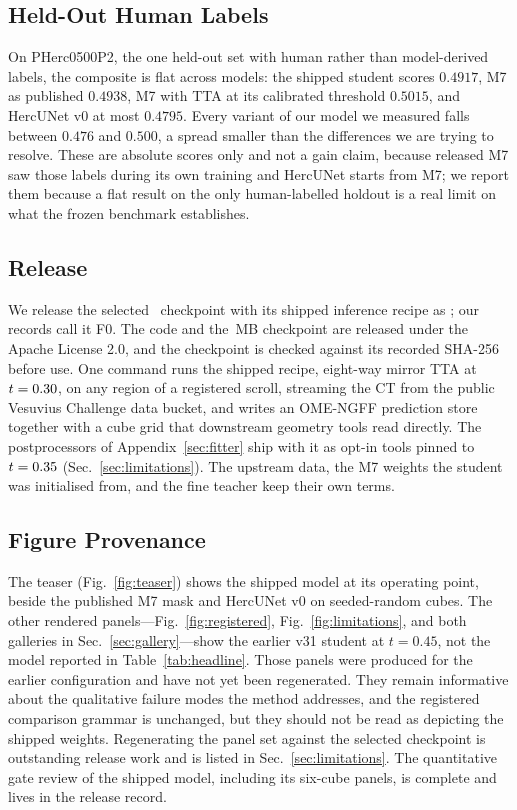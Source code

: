 \subsection{Held-Out Human Labels}

On PHerc0500P2, the one held-out set with human rather than model-derived
labels, the composite is flat across models: the shipped student scores
$0.4917$, M7 as published $0.4938$, M7 with TTA at its calibrated threshold
$0.5015$, and HercUNet v0 at most $0.4795$. Every variant of our model we
measured falls between $0.476$ and $0.500$, a spread smaller than the
differences we are trying to resolve.
These are absolute scores only and not a gain claim, because released M7 saw
those labels during its own training and HercUNet starts from M7; we report
them because a flat result on the only human-labelled holdout is a real limit
on what the frozen benchmark establishes.

\subsection{Release}
\label{sec:release}

We release the selected \fzSelectedShort\ checkpoint with its shipped
inference recipe as \releaseName; our records call it F0.
The code and the \checkpointMB\,MB checkpoint are released under the Apache
License 2.0, and the checkpoint is checked against its recorded SHA-256 before
use.
One command runs the shipped recipe, eight-way mirror TTA at $t=0.30$, on
any region of a registered scroll, streaming the CT from the public Vesuvius
Challenge data bucket, and writes an OME-NGFF prediction store together with a
cube grid that downstream geometry tools read directly.
The postprocessors of Appendix~\ref{sec:fitter} ship with it as opt-in tools
pinned to $t=0.35$ (Sec.~\ref{sec:limitations}).
The upstream data, the M7 weights the student was initialised from, and the fine
teacher keep their own terms.

\subsection{Figure Provenance}
\label{sec:figure-provenance}

The teaser (Fig.~\ref{fig:teaser}) shows the shipped model at its operating
point, beside the published M7 mask and HercUNet v0 on seeded-random cubes.
The other rendered panels---Fig.~\ref{fig:registered},
Fig.~\ref{fig:limitations}, and both galleries in
Sec.~\ref{sec:gallery}---show the earlier v31 student at $t=0.45$, not the
model reported in Table~\ref{tab:headline}.
Those panels were produced for the earlier configuration and have not yet been
regenerated.
They remain informative about the qualitative failure modes the method
addresses, and the registered comparison grammar is unchanged, but they should
not be read as depicting the shipped weights.
Regenerating the panel set against the selected checkpoint is outstanding
release work and is listed in Sec.~\ref{sec:limitations}.
The quantitative gate review of the shipped model, including its six-cube
panels, is complete and lives in the release record.

